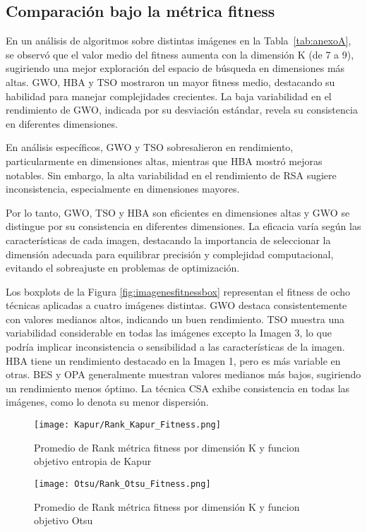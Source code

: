 \documentclass[conference]{IEEEtran}
\begin{document}
\subsection{Comparación bajo la métrica fitness}
\noindent En un análisis de algoritmos sobre distintas imágenes en la Tabla~\ref{tab:anexoA}, se observó que el valor medio del fitness aumenta con la dimensión K (de 7 a 9), sugiriendo una mejor exploración del espacio de búsqueda en dimensiones más altas. GWO, HBA y TSO mostraron un mayor fitness medio, destacando su habilidad para manejar complejidades crecientes. La baja variabilidad en el rendimiento de GWO, indicada por su desviación estándar, revela su consistencia en diferentes dimensiones.

\noindent En análisis específicos, GWO y TSO sobresalieron en rendimiento, particularmente en dimensiones altas, mientras que HBA mostró mejoras notables. Sin embargo, la alta variabilidad en el rendimiento de RSA sugiere inconsistencia, especialmente en dimensiones mayores.

\noindent Por lo tanto, GWO, TSO y HBA son eficientes en dimensiones altas y GWO se distingue por su consistencia en diferentes dimensiones. La eficacia varía según las características de cada imagen, destacando la importancia de seleccionar la dimensión adecuada para equilibrar precisión y complejidad computacional, evitando el sobreajuste en problemas de optimización.


\noindent Los boxplots  de la Figura \ref{fig:imagenesfitnessbox} representan el fitness de ocho técnicas aplicadas a cuatro imágenes distintas. GWO destaca consistentemente con valores medianos altos, indicando un buen rendimiento. TSO muestra una variabilidad considerable en todas las imágenes excepto la Imagen 3, lo que podría implicar inconsistencia o sensibilidad a las características de la imagen. HBA tiene un rendimiento destacado en la Imagen 1, pero es más variable en otras. BES y OPA generalmente muestran valores medianos más bajos, sugiriendo un rendimiento menos óptimo. La técnica CSA exhibe consistencia en todas las imágenes, como lo denota su menor dispersión.



\begin{figure}[!htb]
    \centering
    \texttt{[image: Kapur/Rank\_Kapur\_Fitness.png]}
    \caption{Promedio de Rank métrica fitness por dimensión K y funcion objetivo entropia de Kapur}
    \label{fig:fig510}
\end{figure}
\begin{figure}[!htb]
	\centering
	\texttt{[image: Otsu/Rank\_Otsu\_Fitness.png]}
	\caption{Promedio de Rank métrica fitness por dimensión K y funcion objetivo Otsu}
	\label{fig:fig510}
\end{figure}
\end{document}
